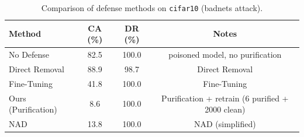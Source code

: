 \begin{table}[htbp]
\centering
\caption{Comparison of defense methods on \texttt{cifar10} (badnets attack).}
\label{tab:results}
\begin{tabular}{lccc}
\toprule
Method & CA (\%) & DR (\%) & Notes \\
\midrule
  No Defense & 82.5 & 100.0 & poisoned model, no purification \\
  Direct Removal & 88.9 & 98.7 & Direct Removal \\
  Fine-Tuning & 41.8 & 100.0 & Fine-Tuning \\
  Ours (Purification) & 8.6 & 100.0 & Purification + retrain (6 purified + 2000 clean) \\
  NAD & 13.8 & 100.0 & NAD (simplified) \\
\bottomrule
\end{tabular}
\end{table}